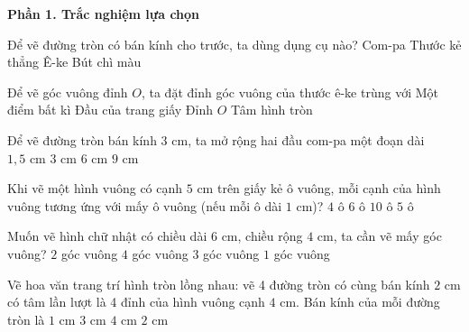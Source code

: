 \textbf{Phần 1. Trắc nghiệm lựa chọn}

\begin{ex} %
Để vẽ đường tròn có bán kính cho trước, ta dùng dụng cụ nào?
\choice
{\True Com-pa}
{Thước kẻ thẳng}
{Ê-ke}
{Bút chì màu}
\end{ex}

\begin{ex} %
Để vẽ góc vuông đỉnh $O$, ta đặt đỉnh góc vuông của thước ê-ke trùng với
\choice
{Một điểm bất kì}
{Đầu của trang giấy}
{\True Đỉnh $O$}
{Tâm hình tròn}
\end{ex}

\begin{ex} %
Để vẽ đường tròn bán kính $3\text{ cm}$, ta mở rộng hai đầu com-pa một đoạn dài
\choice
{$1{,}5\text{ cm}$}
{\True $3\text{ cm}$}
{$6\text{ cm}$}
{$9\text{ cm}$}
\end{ex}

\begin{ex} %
Khi vẽ một hình vuông có cạnh $5\text{ cm}$ trên giấy kẻ ô vuông, mỗi cạnh của hình vuông tương ứng với mấy ô vuông (nếu mỗi ô dài $1\text{ cm}$)?
\choice
{$4$ ô}
{$6$ ô}
{$10$ ô}
{\True $5$ ô}
\end{ex}

\begin{ex} %
Muốn vẽ hình chữ nhật có chiều dài $6\text{ cm}$, chiều rộng $4\text{ cm}$, ta cần vẽ mấy góc vuông?
\choice
{$2$ góc vuông}
{\True $4$ góc vuông}
{$3$ góc vuông}
{$1$ góc vuông}
\end{ex}

\begin{ex} %
Vẽ hoa văn trang trí hình tròn lồng nhau: vẽ 4 đường tròn có cùng bán kính $2\text{ cm}$ có tâm lần lượt là 4 đỉnh của hình vuông cạnh $4\text{ cm}$. Bán kính của mỗi đường tròn là
\choice
{$1\text{ cm}$}
{$3\text{ cm}$}
{$4\text{ cm}$}
{\True $2\text{ cm}$}
\end{ex}

